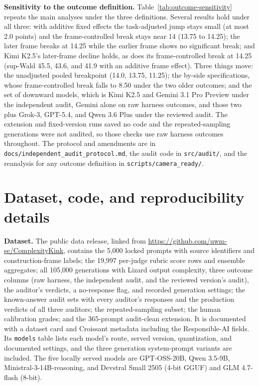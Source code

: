 \documentclass{article}
\newcommand{\codeurl}{\url{https://github.com/uwm-se/ComplexityKink}}
\begin{document}
\textbf{Sensitivity to the outcome definition.} Table~\ref{tab:outcome-sensitivity} repeats the main analyses under the three definitions. Several results hold under all three: with additive fixed effects the task-adjusted jump stays small (at most 2.0 points) and the frame-controlled break stays near 14 (13.75 to 14.25); the later frame breaks at 14.25 while the earlier frame shows no significant break; and Kimi K2.5's later-frame decline holds, as does its frame-controlled break at 14.25 (sup-Wald 45.5, 43.6, and 41.9 with an additive frame effect). Three things move: the unadjusted pooled breakpoint (14.0, 13.75, 11.25); the by-side specifications, whose frame-controlled break falls to 8.50 under the two older outcomes; and the set of downward models, which is Kimi K2.5 and Gemini 3.1 Pro Preview under the independent audit, Gemini alone on raw harness outcomes, and those two plus Grok-3, GPT-5.4, and Qwen 3.6 Plus under the reviewed audit. The extension and fixed-version runs saved no code and the repeated-sampling generations were not audited, so those checks use raw harness outcomes throughout. The protocol and amendments are in \texttt{docs/independent\_audit\_protocol.md}, the audit code in \texttt{src/audit/}, and the reanalysis for any outcome definition in \texttt{scripts/camera\_ready/}.

\section{Dataset, code, and reproducibility details}
\label{app:artifact}

\textbf{Dataset.} The public data release, linked from \codeurl{}, contains the 5{,}000 locked prompts with source identifiers and construction-frame labels; the 19{,}997 per-judge rubric score rows and ensemble aggregates; all 105{,}000 generations with Lizard output complexity, three outcome columns (raw harness, the independent audit, and the reviewed version's audit), the auditor's verdicts, a no-response flag, and recorded generation settings; the known-answer audit sets with every auditor's responses and the production verdicts of all three auditors; the repeated-sampling subset; the human calibration grades; and the 365-prompt audit-clean extension. It is documented with a dataset card and Croissant metadata including the Responsible-AI fields. Its \texttt{models} table lists each model's route, served version, quantization, and documented settings, and the three generation system-prompt variants are included. The five locally served models are GPT-OSS-20B, Qwen 3.5-9B, Ministral-3-14B-reasoning, and Devstral Small 2505 (4-bit GGUF) and GLM 4.7-flash (8-bit).
\end{document}
